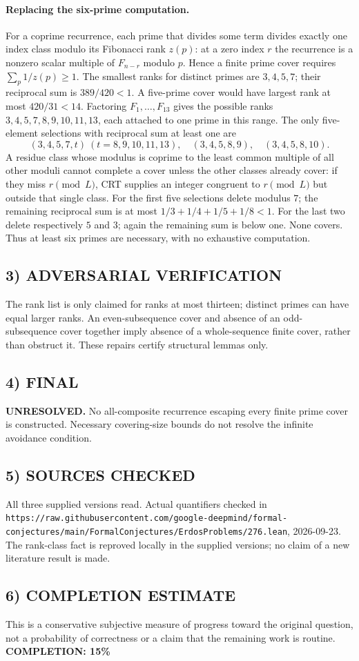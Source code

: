 \paragraph{Replacing the six-prime computation.}
For a coprime recurrence, each prime that divides some term divides exactly one index class modulo its Fibonacci rank $z(p)$: at a zero index $r$ the recurrence is a nonzero scalar multiple of $F_{n-r}$ modulo $p$. Hence a finite prime cover requires $\sum_p1/z(p)\ge1$.
The smallest ranks for distinct primes are $3,4,5,7$; their reciprocal sum is $389/420<1$. A five-prime cover would have largest rank at most $420/31<14$. Factoring $F_1,\ldots,F_{13}$ gives the possible ranks
$3,4,5,7,8,9,10,11,13$, each attached to one prime in this range. The only five-element selections with reciprocal sum at least one are
\[
(3,4,5,7,t)\ (t=8,9,10,11,13),\quad(3,4,5,8,9),\quad(3,4,5,8,10).
\]
A residue class whose modulus is coprime to the least common multiple of all other moduli cannot complete a cover unless the other classes already cover: if they miss $r\pmod L$, CRT supplies an integer congruent to $r\pmod L$ but outside that single class.
For the first five selections delete modulus $7$; the remaining reciprocal sum is at most $1/3+1/4+1/5+1/8<1$. For the last two delete respectively $5$ and $3$; again the remaining sum is below one. None covers. Thus at least six primes are necessary, with no exhaustive computation.
\subsection{3) ADVERSARIAL VERIFICATION}
The rank list is only claimed for ranks at most thirteen; distinct primes can have equal larger ranks. An even-subsequence cover and absence of an odd-subsequence cover together imply absence of a whole-sequence finite cover, rather than obstruct it. These repairs certify structural lemmas only.
\subsection{4) FINAL}
\textbf{UNRESOLVED.}
No all-composite recurrence escaping every finite prime cover is constructed. Necessary covering-size bounds do not resolve the infinite avoidance condition.
\subsection{5) SOURCES CHECKED}
All three supplied versions read. Actual quantifiers checked in \texttt{https://raw.githubusercontent.com/google-deepmind/formal-conjectures/main/FormalConjectures/ErdosProblems/276.lean}, 2026-09-23. The rank-class fact is reproved locally in the supplied versions; no claim of a new literature result is made.
\subsection{6) COMPLETION ESTIMATE}
This is a conservative subjective measure of progress toward the original question, not a probability of correctness or a claim that the remaining work is routine.
\textbf{COMPLETION: 15\%}
